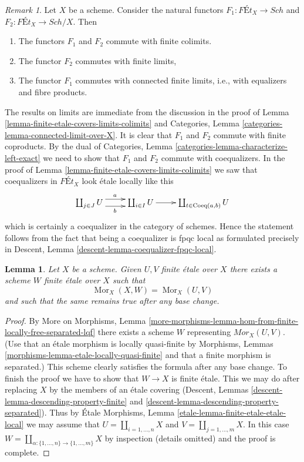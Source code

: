 \documentclass{stacks-project}
\theoremstyle{plain}
\newtheorem{lemma}[subsection]{Lemma}
\theoremstyle{definition}
\theoremstyle{remark}
\newtheorem{remark}[subsection]{Remark}
\numberwithin{equation}{subsection}
\def\Sch{\mathit{Sch}}
\def\Mor{\mathop{\mathrm{Mor}}\nolimits}
\begin{document}
\begin{remark}
\label{remark-colimits-commute-forgetful}
Let $X$ be a scheme. Consider the natural functors
$F_1 : \textit{F\'Et}_X \to \Sch$ and $F_2 : \textit{F\'Et}_X \to \Sch/X$.
Then
\begin{enumerate}
\item The functors $F_1$ and $F_2$ commute with finite colimits.
\item The functor $F_2$ commutes with finite limits,
\item The functor $F_1$ commutes with connected finite limits, i.e.,
with equalizers and fibre products.
\end{enumerate}
The results on limits are immediate from the discussion in
the proof of Lemma \ref{lemma-finite-etale-covers-limits-colimits}
and Categories, Lemma \ref{categories-lemma-connected-limit-over-X}.
It is clear that $F_1$ and $F_2$ commute with finite coproducts.
By the dual of Categories, Lemma
\ref{categories-lemma-characterize-left-exact}
we need to show that $F_1$ and $F_2$ commute with coequalizers.
In the proof of Lemma \ref{lemma-finite-etale-covers-limits-colimits}
we saw that coequalizers in $\textit{F\'Et}_X$ look \'etale locally
like this
$$
\xymatrix{
\coprod_{j \in J} U \ar@<1ex>[r]^a \ar@<-1ex>[r]_b &
\coprod_{i \in I} U \ar[r] &
\coprod_{t \in \text{Coeq}(a, b)} U
}
$$
which is certainly a coequalizer in the category of schemes.
Hence the statement follows from the fact that being a coequalizer
is fpqc local as formulated precisely in
Descent, Lemma \ref{descent-lemma-coequalizer-fpqc-local}.
\end{remark}

\begin{lemma}
\label{lemma-internal-hom-finite-etale}
Let $X$ be a scheme. Given $U, V$ finite \'etale over $X$ there
exists a scheme $W$ finite \'etale over $X$ such that
$$
\Mor_X(X, W) = \Mor_X(U, V)
$$
and such that the same remains true after any base change.
\end{lemma}

\begin{proof}
By More on Morphisms, Lemma
\ref{more-morphisms-lemma-hom-from-finite-locally-free-separated-lqf}
there exists a scheme $W$ representing $\mathit{Mor}_X(U, V)$.
(Use that an \'etale morphism is locally quasi-finite by
Morphisms, Lemmas \ref{morphisms-lemma-etale-locally-quasi-finite}
and that a finite morphism is separated.)
This scheme clearly satisfies the formula after any base change.
To finish the proof we have to show that $W \to X$ is finite \'etale.
This we may do after replacing $X$ by the members of an \'etale
covering (Descent, Lemmas \ref{descent-lemma-descending-property-finite}
and \ref{descent-lemma-descending-property-separated}).
Thus by \'Etale Morphisms, Lemma \ref{etale-lemma-finite-etale-etale-local}
we may assume that $U = \coprod_{i = 1, \ldots, n} X$
and $V = \coprod_{j = 1, \ldots, m} X$.
In this case
$W = \coprod_{\alpha : \{1, \ldots, n\} \to \{1, \ldots, m\}} X$
by inspection (details omitted) and the proof is complete.
\end{proof}
\end{document}
